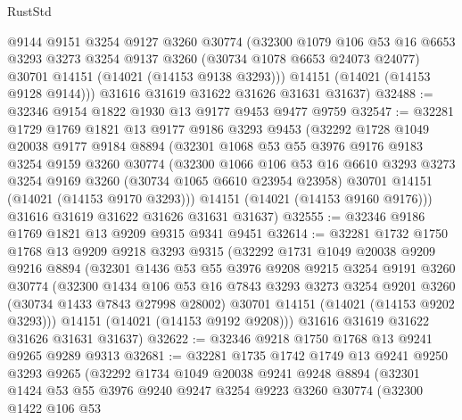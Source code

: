 \begin{lexlean}{RustStd}
\begin{coremodule}
        @9144
        @9151
        @3254
        @9127
        @3260
        @30774
        (@32300
          @1079
          @106
          @53
          @16
          @6653
          @3293
          @3273
          @3254
          @9137
          @3260
          (@30734 @1078 @6653 @24073 @24077)
          @30701
          @14151
          (@14021 (@14153 @9138 @3293)))
        @14151
        (@14021 (@14153 @9128 @9144)))
      @31616
      @31619
      @31622
      @31626
      @31631
      @31637)
@32488 := @32346 @9154 @1822 @1930 @13 @9177 @9453 @9477 @9759
@32547 := @32281
    @1729
    @1769
    @1821
    @13
    @9177
    @9186
    @3293
    @9453
    (@32292
      @1728
      @1049
      @20038
      @9177
      @9184
      @8894
      (@32301
        @1068
        @53
        @55
        @3976
        @9176
        @9183
        @3254
        @9159
        @3260
        @30774
        (@32300
          @1066
          @106
          @53
          @16
          @6610
          @3293
          @3273
          @3254
          @9169
          @3260
          (@30734 @1065 @6610 @23954 @23958)
          @30701
          @14151
          (@14021 (@14153 @9170 @3293)))
        @14151
        (@14021 (@14153 @9160 @9176)))
      @31616
      @31619
      @31622
      @31626
      @31631
      @31637)
@32555 := @32346 @9186 @1769 @1821 @13 @9209 @9315 @9341 @9451
@32614 := @32281
    @1732
    @1750
    @1768
    @13
    @9209
    @9218
    @3293
    @9315
    (@32292
      @1731
      @1049
      @20038
      @9209
      @9216
      @8894
      (@32301
        @1436
        @53
        @55
        @3976
        @9208
        @9215
        @3254
        @9191
        @3260
        @30774
        (@32300
          @1434
          @106
          @53
          @16
          @7843
          @3293
          @3273
          @3254
          @9201
          @3260
          (@30734 @1433 @7843 @27998 @28002)
          @30701
          @14151
          (@14021 (@14153 @9202 @3293)))
        @14151
        (@14021 (@14153 @9192 @9208)))
      @31616
      @31619
      @31622
      @31626
      @31631
      @31637)
@32622 := @32346 @9218 @1750 @1768 @13 @9241 @9265 @9289 @9313
@32681 := @32281
    @1735
    @1742
    @1749
    @13
    @9241
    @9250
    @3293
    @9265
    (@32292
      @1734
      @1049
      @20038
      @9241
      @9248
      @8894
      (@32301
        @1424
        @53
        @55
        @3976
        @9240
        @9247
        @3254
        @9223
        @3260
        @30774
        (@32300
          @1422
          @106
          @53

\end{coremodule}
\end{lexlean}
